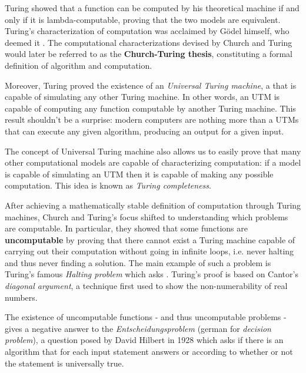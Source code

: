 Turing \cite{turing} showed that a function can be computed by his theoretical machine if and only if it is lambda-computable, proving that the two models are equivalent. Turing's characterization of computation was acclaimed by Gödel himself, who deemed it . The computational characterizations devised by Church and Turing would later be referred to as the \textbf{Church-Turing thesis}, constituting a formal definition of algorithm and computation.

Moreover, Turing proved the existence of an \textit{Universal Turing machine}, a \TM that is capable of simulating any other Turing machine. In other words, an \textsf{UTM} is capable of computing any function computable by another Turing machine. This result shouldn't be a surprise: modern computers are nothing more than a \textsf{UTM}s that can execute any given algorithm, producing an output for a given input.

The concept of Universal Turing machine also allows us to easily prove that many other computational models are capable of characterizing computation: if a model is capable of simulating an \textsf{UTM} then it is capable of making any possible computation. This idea is known as \textit{Turing completeness}.

After achieving a mathematically stable definition of computation through Turing machines, Church and Turing's focus shifted to understanding which problems are computable. In particular, they showed that some functions are \textbf{uncomputable} by proving that there cannot exist a Turing machine capable of carrying out their computation without going in infinite loops, i.e. never halting and thus never finding a solution. The main example of such a problem is Turing's famous \textit{Halting problem} which asks . Turing's proof is based on Cantor's \textit{diagonal argument}, a technique first used to show the non-numerability of real numbers.

The existence of uncomputable functions - and thus uncomputable problems - gives a negative answer to the \textit{Entscheidungsproblem} (german for \textit{decision problem}), a question posed by David Hilbert in 1928 which asks if there is an algorithm that for each input statement answers  or  according to whether or not the statement is universally true.

\newpage

